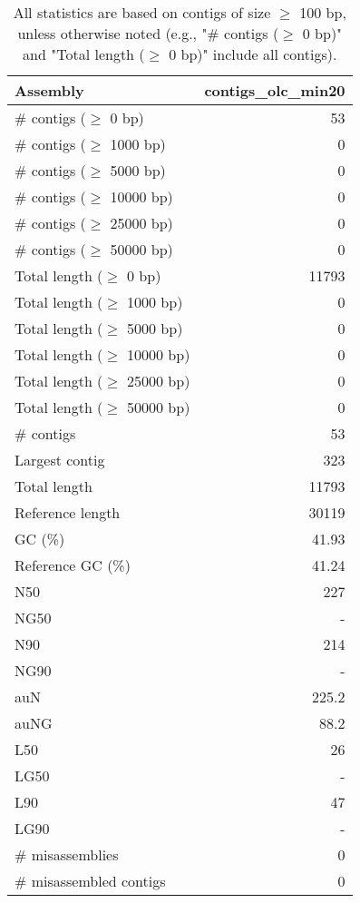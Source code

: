 \documentclass[12pt,a4paper]{article}
\begin{document}
\begin{table}[ht]
\begin{center}
\caption{All statistics are based on contigs of size $\geq$ 100 bp, unless otherwise noted (e.g., "\# contigs ($\geq$ 0 bp)" and "Total length ($\geq$ 0 bp)" include all contigs).}
\begin{tabular}{|l*{1}{|r}|}
\hline
Assembly & contigs\_olc\_min20 \\ \hline
\# contigs ($\geq$ 0 bp) & 53 \\ \hline
\# contigs ($\geq$ 1000 bp) & 0 \\ \hline
\# contigs ($\geq$ 5000 bp) & 0 \\ \hline
\# contigs ($\geq$ 10000 bp) & 0 \\ \hline
\# contigs ($\geq$ 25000 bp) & 0 \\ \hline
\# contigs ($\geq$ 50000 bp) & 0 \\ \hline
Total length ($\geq$ 0 bp) & 11793 \\ \hline
Total length ($\geq$ 1000 bp) & 0 \\ \hline
Total length ($\geq$ 5000 bp) & 0 \\ \hline
Total length ($\geq$ 10000 bp) & 0 \\ \hline
Total length ($\geq$ 25000 bp) & 0 \\ \hline
Total length ($\geq$ 50000 bp) & 0 \\ \hline
\# contigs & 53 \\ \hline
Largest contig & 323 \\ \hline
Total length & 11793 \\ \hline
Reference length & 30119 \\ \hline
GC (\%) & 41.93 \\ \hline
Reference GC (\%) & 41.24 \\ \hline
N50 & 227 \\ \hline
NG50 & - \\ \hline
N90 & 214 \\ \hline
NG90 & - \\ \hline
auN & 225.2 \\ \hline
auNG & 88.2 \\ \hline
L50 & 26 \\ \hline
LG50 & - \\ \hline
L90 & 47 \\ \hline
LG90 & - \\ \hline
\# misassemblies & 0 \\ \hline
\# misassembled contigs & 0 \\ \hline

\end{tabular}
\end{center}
\end{table}
\end{document}
